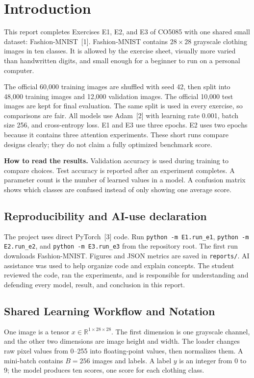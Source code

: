 \documentclass[oneside]{hcmut-report}
\begin{document}
\section*{Introduction}
This report completes Exercises E1, E2, and E3 of CO5085 with one shared small dataset: Fashion-MNIST~[1]. Fashion-MNIST contains $28\times28$ grayscale clothing images in ten classes. It is allowed by the exercise sheet, visually more varied than handwritten digits, and small enough for a beginner to run on a personal computer.

The official 60,000 training images are shuffled with seed 42, then split into 48,000 training images and 12,000 validation images. The official 10,000 test images are kept for final evaluation. The same split is used in every exercise, so comparisons are fair. All models use Adam~[2] with learning rate 0.001, batch size 256, and cross-entropy loss. E1 and E3 use three epochs. E2 uses two epochs because it contains three attention experiments. These short runs compare designs clearly; they do not claim a fully optimized benchmark score.

\begin{importantbox}
\textbf{How to read the results.} Validation accuracy is used during training to compare choices. Test accuracy is reported after an experiment completes. A parameter count is the number of learned values in a model. A confusion matrix shows which classes are confused instead of only showing one average score.
\end{importantbox}

\subsection*{Reproducibility and AI-use declaration}
The project uses direct PyTorch~[3] code. Run \texttt{python -m E1.run\_e1}, \texttt{python -m E2.run\_e2}, and \texttt{python -m E3.run\_e3} from the repository root. The first run downloads Fashion-MNIST. Figures and JSON metrics are saved in \texttt{reports/}. AI assistance was used to help organize code and explain concepts. The student reviewed the code, ran the experiments, and is responsible for understanding and defending every model, result, and conclusion in this report.

\subsection*{Shared Learning Workflow and Notation}
One image is a tensor $x\in\mathbb{R}^{1\times28\times28}$. The first dimension is one grayscale channel, and the other two dimensions are image height and width. The loader changes raw pixel values from 0--255 into floating-point values, then normalizes them. A mini-batch contains $B=256$ images and labels. A label $y$ is an integer from 0 to 9; the model produces ten scores, one score for each clothing class.
\end{document}
